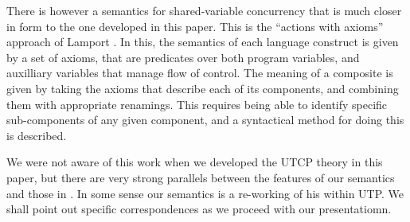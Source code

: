 There is however a semantics for shared-variable concurrency
that is much closer in form to the one developed in this paper.
This is the ``actions with axioms'' approach of Lamport \cite{Lamport1985}.
In this, the semantics of each language construct is given by a set
of axioms, that are predicates over both program variables,
and auxilliary variables that manage flow of control.
The meaning of a composite is given by taking the axioms that
describe each of its components, and combining them with appropriate
renamings.
This requires being able to identify specific sub-components
of any given component, and a syntactical method for doing this
is described.

We were not aware of this work when we developed the UTCP theory
in this paper,
but there are very strong parallels between the features of our
semantics and those in \cite{Lamport1985}.
In some sense our semantics is a re-working of his within UTP.
We shall point out specific correspondences as we proceed with our presentatiomn.
